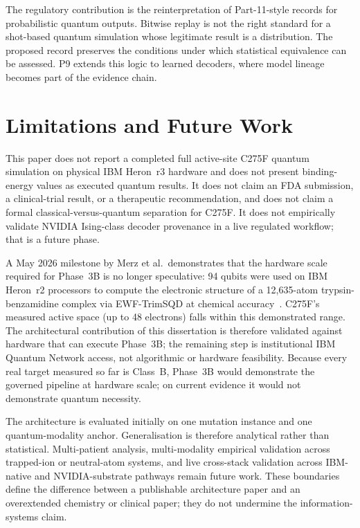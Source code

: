 \documentclass[11pt,letterpaper]{article}
\begin{document}
The regulatory contribution is the reinterpretation of Part-11-style records for
probabilistic quantum outputs.  Bitwise replay is not the right standard for a shot-based
quantum simulation whose legitimate result is a distribution.  The proposed record
preserves the conditions under which statistical equivalence can be assessed.  P9 extends
this logic to learned decoders, where model lineage becomes part of the evidence chain.

\section{Limitations and Future Work}

This paper does not report a completed full active-site C275F quantum simulation on physical
IBM Heron~r3 hardware and does not present binding-energy values as executed quantum
results.  It does not claim an FDA submission, a clinical-trial result, or a therapeutic
recommendation, and does not claim a formal classical-versus-quantum separation for C275F.
It does not empirically validate NVIDIA Ising-class decoder provenance in a live regulated
workflow; that is a future phase.

A May 2026 milestone by Merz et al.\ demonstrates that the hardware scale required for
Phase~3B is no longer speculative: 94 qubits were used on IBM Heron~r2 processors to
compute the electronic structure of a 12,635-atom trypsin-benzamidine complex via
EWF-TrimSQD at chemical accuracy~\cite{merz2026protein}.  C275F's measured active
space (up to 48 electrons) falls within this demonstrated range.  The architectural contribution of this dissertation is therefore validated against
hardware that can execute Phase~3B; the remaining step is institutional IBM Quantum Network
access, not algorithmic or hardware feasibility.  Because every real target measured so far
is Class~B, Phase~3B would demonstrate the governed pipeline at hardware scale; on current
evidence it would not demonstrate quantum necessity.

The architecture is evaluated initially on one mutation instance and one quantum-modality
anchor.  Generalisation is therefore analytical rather than statistical.  Multi-patient
analysis, multi-modality empirical validation across trapped-ion or neutral-atom systems,
and live cross-stack validation across IBM-native and NVIDIA-substrate pathways remain
future work.  These boundaries define the difference between a publishable architecture
paper and an overextended chemistry or clinical paper; they do not undermine the
information-systems claim.
\end{document}
